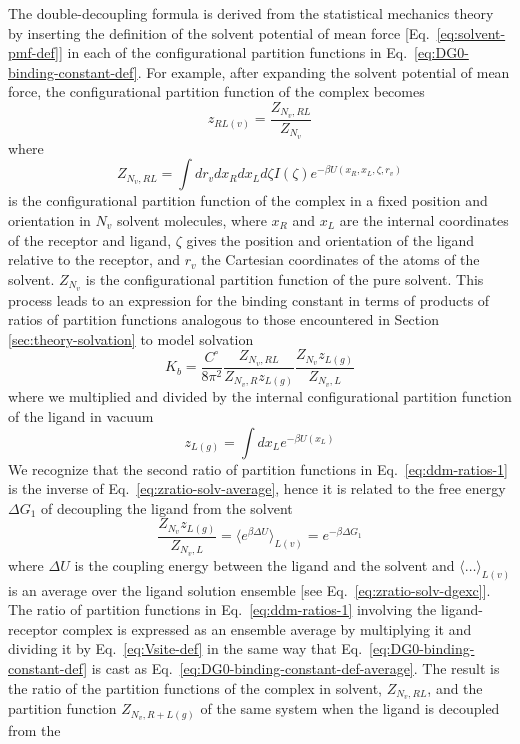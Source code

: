 \documentclass[9pt,bestpractices]{livecoms}
\begin{document}
The double-decoupling formula is derived from the statistical mechanics theory
by inserting the definition of the solvent potential of mean force [Eq.~\ref{eq:solvent-pmf-def}] in each of the configurational partition functions in  Eq.~\ref{eq:DG0-binding-constant-def}. For example, after expanding the solvent potential of mean force, the configurational partition function of the complex becomes
\begin{equation}\label{eq:partfunct-ratio-explsolv-1}
z_{RL(v)} = \frac{Z_{N_v, RL}}{Z_{N_v}}
\end{equation}
where
\begin{equation}\label{eq:partfunct-ratio-explsolv-2}
Z_{N_v, RL} = \int dr_v dx_R dx_L d\zeta I(\zeta) e^{-\beta U(x_R, x_L, \zeta, r_v)}
\end{equation}
is the configurational partition function of the complex in a fixed position and orientation in $N_v$ solvent molecules, where $x_R$ and $x_L$ are the internal coordinates of the receptor and ligand, $\zeta$ gives the position and orientation of the ligand relative to the receptor, and $r_v$ the Cartesian coordinates of the atoms of the solvent. $Z_{N_v}$ is the configurational partition function of the pure solvent. This process leads to an expression for the binding constant in terms of products of ratios of partition functions analogous to those encountered in Section \ref{sec:theory-solvation} to model solvation
\begin{equation}
  K_b = \frac{C^\circ}{8 \pi^2} \frac{Z_{N_v,RL}}{Z_{N_v,R} z_{L(g)}} \frac{Z_{N_v} z_{L(g)}}{Z_{N_v,L}}
  \label{eq:ddm-ratios-1}
\end{equation}
where we multiplied and divided by the internal configurational partition function of the ligand in vacuum
\begin{equation}
z_{L(g)} = \int dx_L e^{-\beta U(x_L)}
\end{equation}
We recognize that the second ratio of partition functions in Eq.~\ref{eq:ddm-ratios-1} is the inverse of Eq.~\ref{eq:zratio-solv-average}, hence it is related to the free energy $\Delta G_1$ of decoupling the ligand from the solvent
\begin{equation}
\frac{Z_{N_v} z_{L(g)}}{Z_{N_v,L}} = \langle e^{\beta \Delta U}  \rangle_{L(v)} = e^{-\beta \Delta G_1}
\end{equation}
where $\Delta U$ is the coupling energy between the ligand and the solvent and $\langle \ldots \rangle_{L(v)}$ is an average over the ligand solution ensemble [see Eq.~\ref{eq:zratio-solv-dgexc}].
The ratio of partition functions in Eq.~\ref{eq:ddm-ratios-1} involving the ligand-receptor complex is expressed as an ensemble average by multiplying it and dividing it by Eq.~\ref{eq:Vsite-def} in the same way that Eq.~\ref{eq:DG0-binding-constant-def} is cast as Eq.~\ref{eq:DG0-binding-constant-def-average}. The result is the ratio of the partition functions of the complex in solvent, $Z_{N_v,RL}$, and the partition function $Z_{N_v,R + L(g)}$  of the same system when the ligand is decoupled from the
\end{document}
